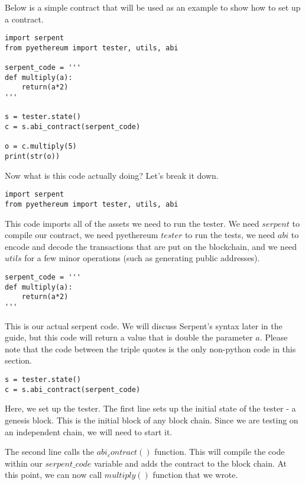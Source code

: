 \documentclass[12pt]{article}
\begin{document}
Below is a simple contract that will be used as an example to show how to set up a contract. \cite{test_contracts.py,Usingpyethereum.tester}

\begin{mdframed}
\begin{verbatim}
import serpent
from pyethereum import tester, utils, abi

serpent_code = '''
def multiply(a):
	return(a*2)
'''

s = tester.state()
c = s.abi_contract(serpent_code)

o = c.multiply(5)
print(str(o))
\end{verbatim}
\end{mdframed}

Now what is this code actually doing? Let's break it down.

\begin{verbatim}
import serpent
from pyethereum import tester, utils, abi
\end{verbatim}

This code imports all of the assets we need to run the tester. We need $serpent$ to compile our contract, we need pyethereum $tester$ to run the tests, we need $abi$ to encode and decode the transactions that are put on the blockchain, and we need $utils$ for a few minor operations (such as generating public addresses).

\begin{verbatim}
serpent_code = '''
def multiply(a):
	return(a*2)
'''
\end{verbatim}

This is our actual serpent code. We will discuss Serpent's syntax later in the guide, but this code will return a value that is double the parameter $a$. Please note that the code between the triple quotes is the only non-python code in this section.

\begin{verbatim}
s = tester.state()
c = s.abi_contract(serpent_code)
\end{verbatim}
Here, we set up the tester. The first line sets up the initial state of the tester - a genesis block. This is the initial block of any block chain. Since we are testing on an independent chain, we will need to start it. 

The second line calls the $abi_contract()$ function. This will compile the code within our $serpent\_code$ variable and adds the contract to the block chain. At this point, we can now call $multiply()$ function that we wrote. 
\end{document}
